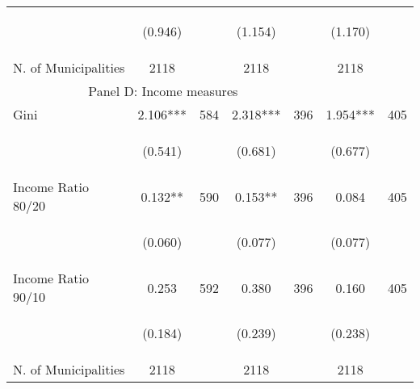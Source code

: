 \begin{tabular}{lcccccc}
\vspace{4pt} &  \begin{footnotesize}(0.946)\end{footnotesize}   & &
			    \begin{footnotesize}(1.154)\end{footnotesize}   & &
			    \begin{footnotesize}(1.170)\end{footnotesize}   &
			     \\

N. of Municipalities   &   2118   & &    2118 &    &  2118  &   \\
\hline	

\multicolumn{5}{c}{Panel D: Income measures} \\

Gini    &  2.106***   &  584  &   2.318***  &  396 &  1.954***  &  405   \\

\vspace{4pt} &  \begin{footnotesize}(0.541)\end{footnotesize}   & &
			    \begin{footnotesize}(0.681)\end{footnotesize}   & &
			    \begin{footnotesize}(0.677)\end{footnotesize}   &
			     \\          


Income Ratio 80/20     &  0.132**   &  590  &   0.153**  &  396 &  0.084  &  405   \\

\vspace{4pt} &  \begin{footnotesize}(0.060)\end{footnotesize}   & &
			    \begin{footnotesize}(0.077)\end{footnotesize}   & &
			    \begin{footnotesize}(0.077)\end{footnotesize}   &
			     \\


Income Ratio 90/10     &  0.253   &  592  &   0.380  &  396 &  0.160  &  405   \\

\vspace{4pt} &  \begin{footnotesize}(0.184)\end{footnotesize}   & &
			    \begin{footnotesize}(0.239)\end{footnotesize}   & &
			    \begin{footnotesize}(0.238)\end{footnotesize}   &
			     \\


N. of Municipalities   &   2118   & &    2118 &    &  2118  &   \\
\hline	


\end{tabular}%
